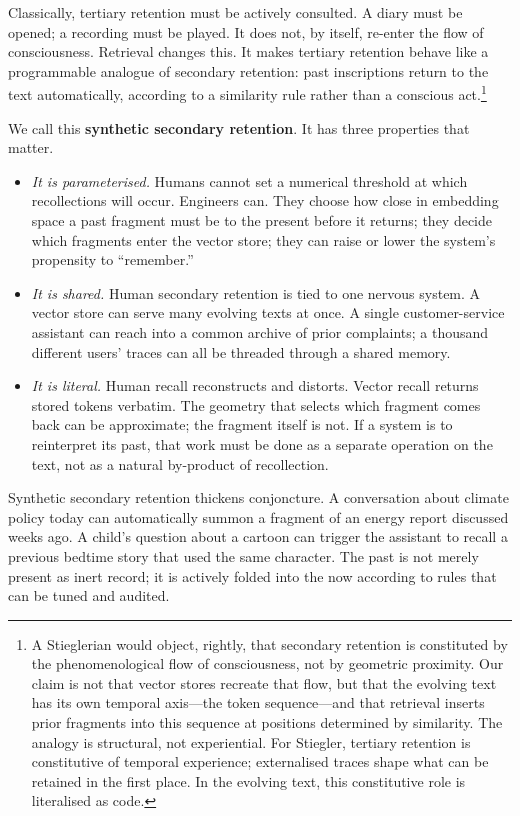 \documentclass[12pt,a4paper]{article}
\begin{document}
Classically, tertiary retention must be actively consulted. A diary must be opened; a recording must be played. It does not, by itself, re-enter the flow of consciousness. Retrieval changes this. It makes tertiary retention behave like a programmable analogue of secondary retention: past inscriptions return to the text automatically, according to a similarity rule rather than a conscious act.\footnote{A Stieglerian would object, rightly, that secondary retention is constituted by the phenomenological flow of consciousness, not by geometric proximity. Our claim is not that vector stores recreate that flow, but that the evolving text has its own temporal axis---the token sequence---and that retrieval inserts prior fragments into this sequence at positions determined by similarity. The analogy is structural, not experiential. For Stiegler, tertiary retention is constitutive of temporal experience; externalised traces shape what can be retained in the first place. In the evolving text, this constitutive role is literalised as code.}

We call this \textbf{synthetic secondary retention}. It has three properties that matter.

\begin{itemize}
  \item \emph{It is parameterised.} Humans cannot set a numerical threshold at which recollections will occur. Engineers can. They choose how close in embedding space a past fragment must be to the present before it returns; they decide which fragments enter the vector store; they can raise or lower the system's propensity to ``remember.''

  \item \emph{It is shared.} Human secondary retention is tied to one nervous system. A vector store can serve many evolving texts at once. A single customer-service assistant can reach into a common archive of prior complaints; a thousand different users' traces can all be threaded through a shared memory.

  \item \emph{It is literal.} Human recall reconstructs and distorts. Vector recall returns stored tokens verbatim. The geometry that selects which fragment comes back can be approximate; the fragment itself is not. If a system is to reinterpret its past, that work must be done as a separate operation on the text, not as a natural by-product of recollection.
\end{itemize}

Synthetic secondary retention thickens conjoncture. A conversation about climate policy today can automatically summon a fragment of an energy report discussed weeks ago. A child's question about a cartoon can trigger the assistant to recall a previous bedtime story that used the same character. The past is not merely present as inert record; it is actively folded into the now according to rules that can be tuned and audited.
\end{document}
